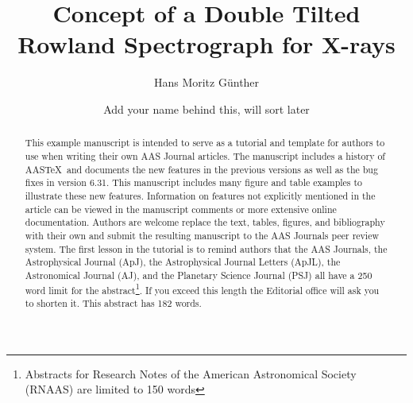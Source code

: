 \documentclass[linenumbers]{aastex631}
\newcommand\aastex{AAS\TeX}
\begin{document}
\title{Concept of a Double Tilted Rowland Spectrograph for X-rays}





\author[0000-0003-4243-2840]{Hans Moritz G{\"u}nther}


\author{Add your name behind this, will sort later}
\affiliation{}

\begin{abstract}

This example manuscript is intended to serve as a tutorial and template for
authors to use when writing their own AAS Journal articles. The manuscript
includes a history of \aastex\ and documents the new features in the
previous versions as well as the bug fixes in version 6.31. This
manuscript includes many figure and table examples to illustrate these new
features.  Information on features not explicitly mentioned in the article
can be viewed in the manuscript comments or more extensive online
documentation. Authors are welcome replace the text, tables, figures, and
bibliography with their own and submit the resulting manuscript to the AAS
Journals peer review system.  The first lesson in the tutorial is to remind
authors that the AAS Journals, the Astrophysical Journal (ApJ), the
Astrophysical Journal Letters (ApJL), the Astronomical Journal (AJ), and
the Planetary Science Journal (PSJ) all have a 250 word limit for the 
abstract\footnote{Abstracts for Research Notes of the American Astronomical 
Society (RNAAS) are limited to 150 words}.  If you exceed this length the
Editorial office will ask you to shorten it. This abstract has 182 words.

\end{abstract}
\end{document}

